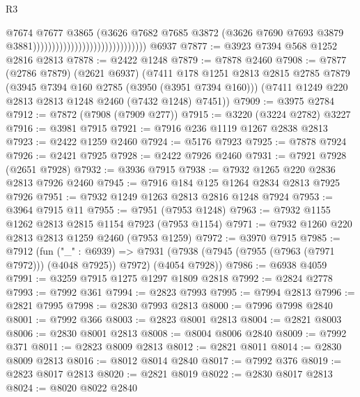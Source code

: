 \begin{lexlean}{R3}
\begin{coremodule}
                                                            @7674
                                                            @7677
                                                            @3865
                                                            (@3626
                                                              @7682
                                                              @7685
                                                              @3872
                                                              (@3626
                                                                @7690
                                                                @7693
                                                                @3879
                                                                @3881))))))))))))))))))))))))))))))
    @6937
@7877 := @3923 @7394 @568 @1252 @2816 @2813
@7878 := @2422 @1248
@7879 := @7878 @2460
@7908 := @7877
    (@2786 @7879)
    (@2621 @6937)
    (@7411
      @178
      @1251
      @2813
      @2815
      @2785
      @7879
      (@3945 @7394 @160 @2785 (@3950 (@3951 @7394 @160)))
      (@7411 @1249 @220 @2813 @2813 @1248 @2460 (@7432 @1248) @7451))
@7909 := @3975 @2784
@7912 := @7872 (@7908 (@7909 @277))
@7915 := @3220 (@3224 @2782) @3227
@7916 := @3981 @7915
@7921 := @7916 @236 @1119 @1267 @2838 @2813
@7923 := @2422 @1259 @2460
@7924 := @5176 @7923
@7925 := @7878 @7924
@7926 := @2421 @7925
@7928 := @2422 @7926 @2460
@7931 := @7921 @7928 (@2651 @7928)
@7932 := @3936 @7915
@7938 := @7932 @1265 @220 @2836 @2813 @7926 @2460
@7945 := @7916 @184 @125 @1264 @2834 @2813 @7925 @7926
@7951 := @7932 @1249 @1263 @2813 @2816 @1248 @7924
@7953 := @3964 @7915 @11
@7955 := @7951 (@7953 @1248)
@7963 := @7932 @1155 @1262 @2813 @2815 @1154 @7923 (@7953 @1154)
@7971 := @7932 @1260 @220 @2813 @2813 @1259 @2460 (@7953 @1259)
@7972 := @3970 @7915
@7985 := @7912
    (fun ("_" : @6939) =>
    @7931 (@7938 (@7945 (@7955 (@7963 (@7971 @7972))) (@4048 @7925)) @7972) (@4054 @7928))
@7986 := @6938 @4059
@7991 := @3259 @7915 @1275 @1297 @1809 @2818
@7992 := @2824 @2778
@7993 := @7992 @361
@7994 := @2823 @7993
@7995 := @7994 @2813
@7996 := @2821 @7995
@7998 := @2830 @7993 @2813
@8000 := @7996 @7998 @2840
@8001 := @7992 @366
@8003 := @2823 @8001 @2813
@8004 := @2821 @8003
@8006 := @2830 @8001 @2813
@8008 := @8004 @8006 @2840
@8009 := @7992 @371
@8011 := @2823 @8009 @2813
@8012 := @2821 @8011
@8014 := @2830 @8009 @2813
@8016 := @8012 @8014 @2840
@8017 := @7992 @376
@8019 := @2823 @8017 @2813
@8020 := @2821 @8019
@8022 := @2830 @8017 @2813
@8024 := @8020 @8022 @2840

\end{coremodule}
\end{lexlean}
